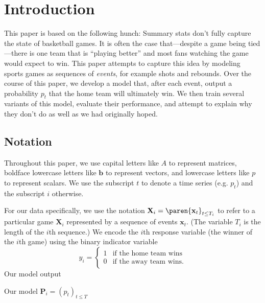 \section{Introduction}

This paper is based on the following hunch: Summary stats don't fully capture the state of basketball games. It is often the case that---despite a game being tied---there is one team that is ``playing better'' and most fans watching the game would expect to win. This paper attempts to capture this idea by modeling sports games as sequences of \emph{events}, for example shots and rebounds. Over the course of this paper, we develop a model that, after each event, output a probability $p_t$ that the home team will ultimately win. We then train several variants of this model, evaluate their performance, and attempt to explain why they don't do as well as we had originally hoped.


\subsection{Notation}

Throughout this paper, we use capital letters like $A$ to represent matrices, boldface lowercase letters like $\mathbf b$ to represent vectors, and lowercase letters like $p$ to represent scalars. We use the subscript $t$ to denote a time series (e.g. $p_t$) and the subscript $i$ otherwise.

For our data specifically, we use the notation $\mathbf X_i = \paren{\mathbf x_t}_{t \leq T_i}$ to refer to a particular game $\mathbf X_i$ represented by a sequence of events $\mathbf x_t$. (The variable $T_i$ is the length of the $i$th sequence.) We encode the $i$th response variable (the winner of the $i$th game) using the binary indicator variable
\begin{equation}
	y_i = \begin{cases}
		1 & \text{if the home team wins}  \\
		0 & \text{if the away team wins}.
	\end{cases}
\end{equation}
Our model output

Our model $\mathbf P_i = (p_t)_{t \leq T}$


